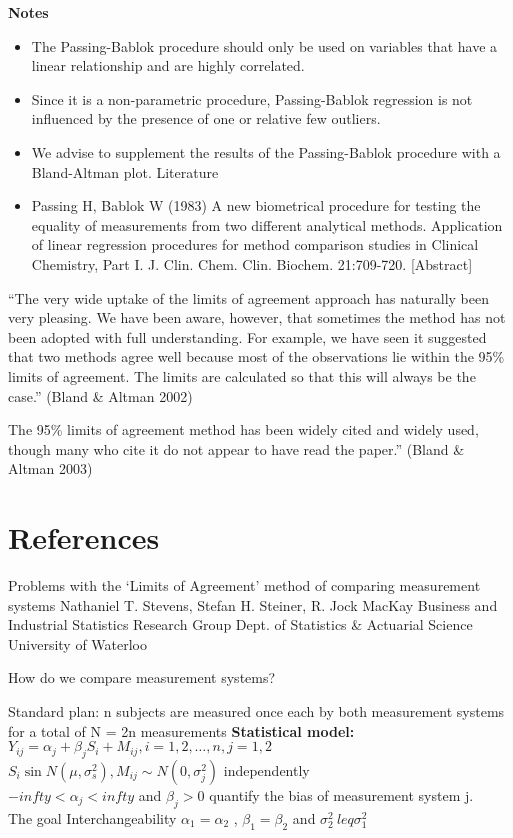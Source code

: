 \documentclass{article}
\begin{document}
\textbf{Notes}
\begin{itemize}
\item The Passing-Bablok procedure should only be used on variables that have a linear relationship and are highly correlated.
\item Since it is a non-parametric procedure, Passing-Bablok regression is not influenced by the presence of one or relative few outliers.
\item We advise to supplement the results of the Passing-Bablok procedure with a Bland-Altman plot.
Literature

\item Passing H, Bablok W (1983) A new biometrical procedure for testing the equality of measurements from two different analytical methods. Application of linear regression procedures for method comparison studies in Clinical Chemistry, Part I. J. Clin. Chem. Clin. Biochem. 21:709-720. [Abstract]
\end{itemize}

 “The very wide uptake of the limits of agreement approach has naturally been very pleasing.
We have been aware, however, that sometimes the method has not been adopted with full
understanding. For example, we have seen it suggested that two methods agree well
because most of the observations lie within the 95\% limits of agreement. The limits are
calculated so that this will always be the case.” (Bland \& Altman 2002)

The 95\% limits of agreement method has been widely cited and widely used, though many
who cite it do not appear to have read the paper.” (Bland \& Altman 2003)

\section{References}
Problems with the ‘Limits of Agreement’
method of comparing measurement systems
Nathaniel T. Stevens, Stefan H. Steiner, R. Jock MacKay
Business and Industrial Statistics Research Group
Dept. of Statistics \& Actuarial Science
University of Waterloo



How do we compare measurement systems?


Standard plan: n subjects are measured once each by both measurement systems for a total
of N = 2n measurements
\textbf{Statistical model:}
\\$Y_{ij} = \alpha_j + \beta_jS_i+M_{ij}, i=1,2,\ldots,n, j=1,2$
\\ $S_i \sin N(\mu, \sigma^2_s), M_{ij} \sim N(0,\sigma^2_j) $ independently
\\$ -infty < \alpha_j < infty$ and $\beta_j>0$ quantify the bias of measurement system j.
\\ The goal
Interchangeability $\alpha_1 = \alpha_2$ , $\beta_1 = \beta_2$ and $\sigma^2_2 \ leq \sigma^2_1$
\end{document}
